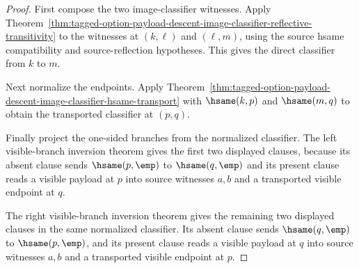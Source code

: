 \begin{proof}
First compose the two image-classifier witnesses. Apply
Theorem~\ref{thm:tagged-option-payload-descent-image-classifier-reflective-transitivity}
to the witnesses at $(k,\ell)$ and $(\ell,m)$, using the source hsame
compatibility and source-reflection hypotheses. This gives the direct
classifier from $k$ to $m$.

Next normalize the endpoints. Apply
Theorem~\ref{thm:tagged-option-payload-descent-image-classifier-hsame-transport}
with $\hsame(k,p)$ and $\hsame(m,q)$ to obtain the transported classifier at
$(p,q)$.

Finally project the one-sided branches from the normalized classifier. The left
visible-branch inversion theorem gives the first two displayed clauses, because
its absent clause sends $\hsame(p,\emp)$ to $\hsame(q,\emp)$ and its present
clause reads a visible payload at $p$ into source witnesses $a,b$ and a
transported visible endpoint at $q$.

The right visible-branch inversion theorem gives the remaining two displayed
clauses in the same normalized classifier. Its absent clause sends
$\hsame(q,\emp)$ to $\hsame(p,\emp)$, and its present clause reads a visible
payload at $q$ into source witnesses $a,b$ and a transported visible endpoint at
$p$.
\end{proof}
